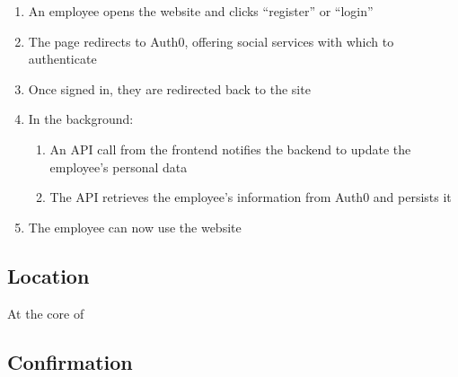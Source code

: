 \begin{enumerate}

  \item An employee opens the \projectname{} website and
        clicks \enquote{register} or \enquote{login}

  \item The page redirects to Auth0, offering social
        services with which to authenticate

  \item Once signed in, they are redirected back to the
        \projectname{} site

  \item In the background:
        \begin{enumerate}
          \item An API call from the frontend notifies the
                backend to update the employee's
                personal data

          \item The API retrieves the employee's
                information from Auth0 and persists it
        \end{enumerate}

  \item The employee can now use the website
\end{enumerate}


\subsection{Location}

At the core of



\subsection{Confirmation}

